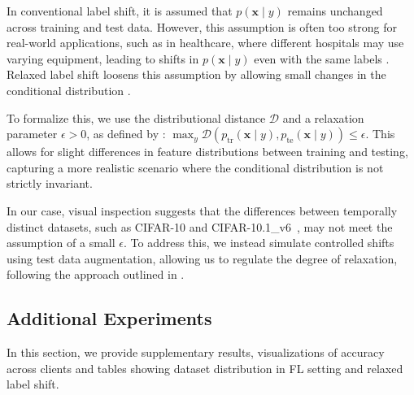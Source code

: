 In conventional label shift, it is assumed that $p(\boldsymbol{x} \mid y)$ remains unchanged across training and test data. However, this assumption is often too strong for real-world applications, such as in healthcare, where different hospitals may use varying equipment, leading to shifts in $p(\boldsymbol{x} \mid y)$ even with the same labels \citep{rajendran2023data}. Relaxed label shift loosens this assumption by allowing small changes in the conditional distribution \citep{rls, Luo2022GeneralizedLS}.

To formalize this, we use the distributional distance $\mathcal{D}$ and a relaxation parameter $\epsilon > 0$, as defined by \citet{rls}: 
$\max_{y} \mathcal{D}\left(p_{\text{tr}}(\boldsymbol{x} \mid y), p_{\text{te}}(\boldsymbol{x} \mid y)\right) \leq \epsilon$. This allows for slight differences in feature distributions between training and testing, capturing a more realistic scenario where the conditional distribution is not strictly invariant.

In our case, visual inspection suggests that the differences between temporally distinct datasets, such as CIFAR-10 and CIFAR-10.1\_v6~\citep{torralba2008tinyimages,recht2018cifar10_1}, may not meet the assumption of a small $\epsilon$. To address this, we instead simulate controlled shifts using test data augmentation, allowing us to regulate the degree of relaxation, following the approach outlined in \citet{rls}.

\subsection{Additional Experiments}
In this section, we provide supplementary results, visualizations of accuracy across clients and tables showing dataset distribution in FL setting and relaxed label shift.

